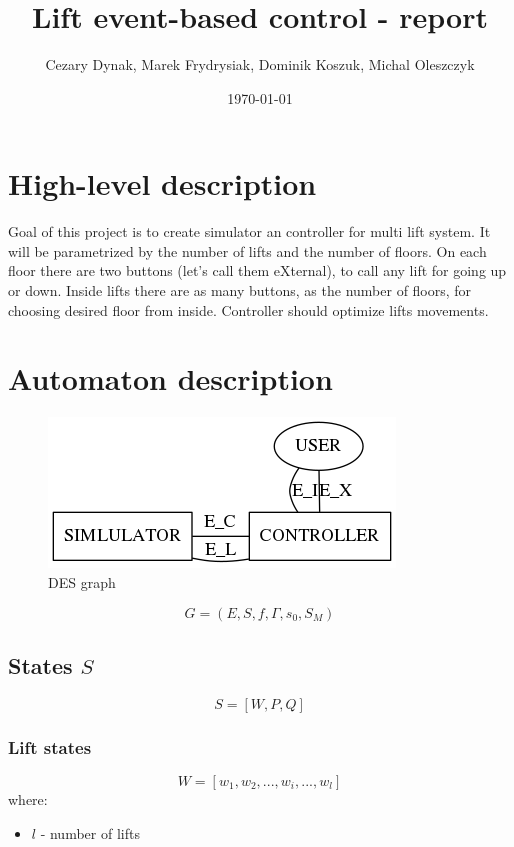 \documentclass{article}
\begin{document}
\title{Lift event-based control - report}
\author{Cezary Dynak, Marek Frydrysiak, Dominik Koszuk, Michal Oleszczyk} 
\date{\today}
\maketitle

\section{High-level description}

Goal of this project is to create simulator an controller for multi lift
system. It will be parametrized by the number of lifts and the number
of floors. On each floor there are two buttons (let's call them eXternal),
to call any lift for going up or down. Inside lifts there are as many buttons,
as the number of floors, for choosing desired floor from inside. Controller
should optimize lifts movements.

\section{Automaton description}

\begin{figure}
  \centering
  \includegraphics{img/simulator_controller.png}
  \caption{DES graph}
\end{figure}

\[ G = (E, S, f, \Gamma, s_0, S_M) \]

\subsection{States \(S\)}

\[ S = [W, P, Q] \]

\subsubsection{Lift states}

\[ W=[w_1, w_2, ..., w_i, ..., w_l ]\]
where:
\begin{itemize}
  \item \(l\) - number of lifts
\end{itemize}
\end{document}

